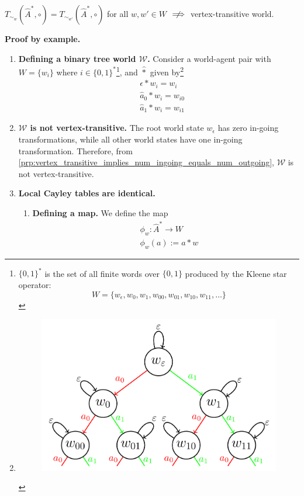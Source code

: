 \begin{propositionE}
     $T_{\sim_{w}}(\hat{A}^{*}, \circ) = T_{\sim_{w'}}(\hat{A}^{*}, \circ)$ for all $w, w' \in W$ $\centernot\implies$ vertex-transitive world.
\end{propositionE}
\begin{proofE}
\textbf{Proof by example.}
\begin{enumerate}
    \item \textbf{Defining a binary tree world $\mathscr{W}$.}
    Consider a world-agent pair with $W = \{w_{i}\}$ where $i \in \{0, 1\}^{*}$\footnote{
    $\{0, 1\}^{*}$ is the set of all finite words over $\{0, 1\}$ produced by the Kleene star operator:
    \begin{equation}
        W = \{ w_{\epsilon}, w_{0}, w_{1}, w_{00}, w_{01}, w_{10}, w_{11}, \dots \}
    \end{equation}
    }, and $\hat{\ast}$ given by\footnote{
    \begin{figure}[H]
        \includegraphics[width=0.5\linewidth]{6BeyondSBDRLLocalAlgebras/Images/binary_tree_world.png}
        \caption{}
    \end{figure}
    }
    \begin{align}
        & \epsilon \ast w_{i} = w_{i} \\
        & \hat{a}_{0} \ast w_{i} = w_{i0} \\
        & \hat{a}_{1} \ast w_{i} = w_{i1}
    \end{align}

    \item \textbf{$\mathscr{W}$ is not vertex-transitive.}
    The root world state $w_{\epsilon}$ has zero in-going transformations, while all other world states have one in-going transformation.
    Therefore, from \cref{prp:vertex_transitive_implies_num_ingoing_equals_num_outgoing}, $\mathscr{W}$ is not vertex-transitive.

    \item \textbf{Local Cayley tables are identical.}
    \begin{enumerate}
        \item \textbf{Defining a map.}
        We define the map
        \begin{align}
            & \phi_{w}: \hat{A}^{*} \to W \\
            & \phi_{w}(a) := a \ast w
        \end{align}


\end{enumerate}
\end{enumerate}
\end{proofE}
